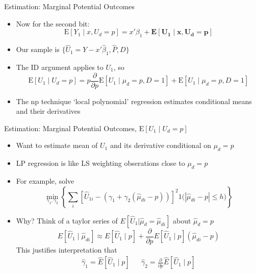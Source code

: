 \documentclass{beamer}
\begin{document}
\begin{frame}{Estimation:  Marginal Potential Outcomes }
  \begin{itemize}
  \item Now for the second bit: \begin{equation*}
      \mathrm{E}[Y_1\mid x,U_d=p]  = x'\beta_1 +  \mathbf{\mathrm{\mathbf{E}}[U_1\mid x,U_d=p]}
    \end{equation*}
\item Our sample is $\{\hat{U}_1= Y-x'\hat{\beta}_1, \hat{P},
  D\}$
\item The ID argument applies to $U_1$, so
\begin{equation*}
  \mathrm{E}[U_1\mid U_d= p] = p \frac{\partial}{\partial
    p}\mathrm{E}[U_1\mid \mu_d=p,D=1] + \mathrm{E}[U_1\mid \mu_d=p,D=1]
\end{equation*}
\item The np technique `local polynomial' regression estimates conditional means and their derivatives
  \end{itemize}

\end{frame}

\begin{frame}{Estimation:  Marginal Potential Outcomes,
    $\mathrm{E}[U_1\mid U_d=p]$}
  \begin{itemize}
    \item Want to estimate mean of $U_1$ and its derivative conditional on ${\mu}_d=p$
  \item LP regression is like LS weighting obserations close to ${\mu}_d=p$
\item For example, solve
  \begin{equation*}
   \min_{\gamma_1,\gamma_2} \left\{ \sum_i\left[\hat{U}_{1i}-(\gamma_1 +
      \gamma_2(\hat{\mu}_{di}-p))\right]^2\mathrm{1}{\bigl(|\hat{\mu}_{di} - p| \le h\bigr)}\right\}
  \end{equation*}
\item Why? Think of a taylor series of $E[\hat{U}_{1}|
 \hat{\mu}_{d}=\hat{\mu}_{di}]$
  about $\hat{\mu}_d = p$
  \begin{equation*}
    E[\hat{U}_{1}\mid \hat{\mu}_{di}] \approx E[\hat{U}_{1}\mid p] +
    \frac{\partial}{\partial p} E[\hat{U}_{1}\mid p] (\hat{\mu}_{di}-p)
  \end{equation*}
This justifies interpretation that
\begin{eqnarray*}
  \hat{\gamma}_1 = \hat{E}[\hat{U}_{1}\mid p] & & \hat{\gamma}_2 = \frac{\partial}{\partial p} \hat{E}[\hat{U}_{1}\mid p]
\end{eqnarray*}
  \end{itemize}
\end{frame}
\end{document}
